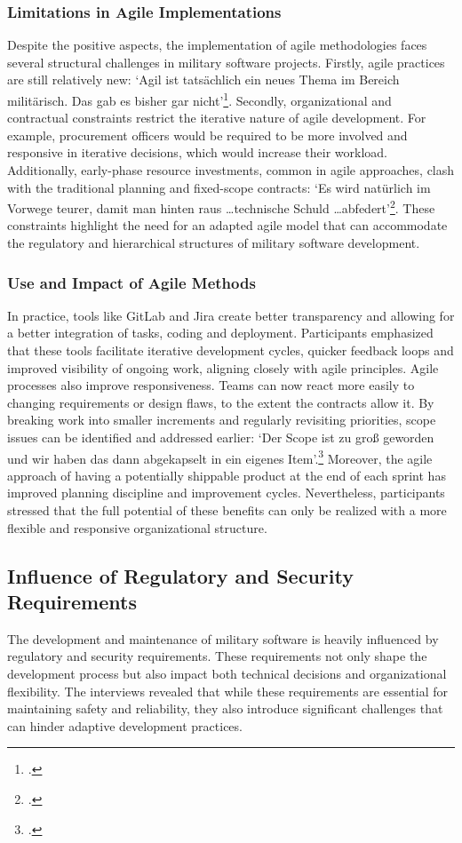 \subsubsection{Limitations in Agile Implementations}
Despite the positive aspects, the implementation of agile methodologies faces several structural challenges in military software projects. Firstly, agile practices are still relatively new: `Agil ist tatsächlich ein neues Thema im Bereich militärisch. Das gab es bisher gar nicht'\footcite{Interview12025}.
Secondly, organizational and contractual constraints restrict the iterative nature of agile development. For example, procurement officers would be required to be more involved and responsive in iterative decisions, which would increase their workload. Additionally, early-phase resource investments, common in agile approaches,
clash with the traditional planning and fixed-scope contracts: `Es wird natürlich im Vorwege teurer, damit man hinten raus \ldots technische Schuld \ldots abfedert'\footcite{Interview12025}. These constraints highlight the need for an adapted agile model that can accommodate the regulatory and hierarchical structures of military software development.

\subsubsection{Use and Impact of Agile Methods}
In practice, tools like GitLab and Jira create better transparency and allowing for a better integration of tasks, coding and deployment. Participants emphasized that these tools facilitate iterative development cycles, quicker feedback loops and 
improved visibility of ongoing work, aligning closely with agile principles. 
Agile processes also improve responsiveness. Teams can now react more easily to changing requirements or design flaws, to the extent the contracts allow it. By breaking work into smaller increments and regularly revisiting priorities, scope issues can be identified and addressed earlier:
`Der Scope ist zu groß geworden und wir haben das dann abgekapselt in ein eigenes Item'.\footcite{Interview32025} Moreover, the agile approach of having a potentially shippable product at the end of each sprint has improved planning discipline and improvement cycles.
Nevertheless, participants stressed that the full potential of these benefits can only be realized with a more flexible and responsive organizational structure.

\subsection{Influence of Regulatory and Security Requirements}
The development and maintenance of military software is heavily influenced by regulatory and security requirements. These requirements not only shape the development process but also impact both technical decisions and organizational flexibility.
The interviews revealed that while these requirements are essential for maintaining safety and reliability, they also introduce significant challenges that can hinder adaptive development practices.

